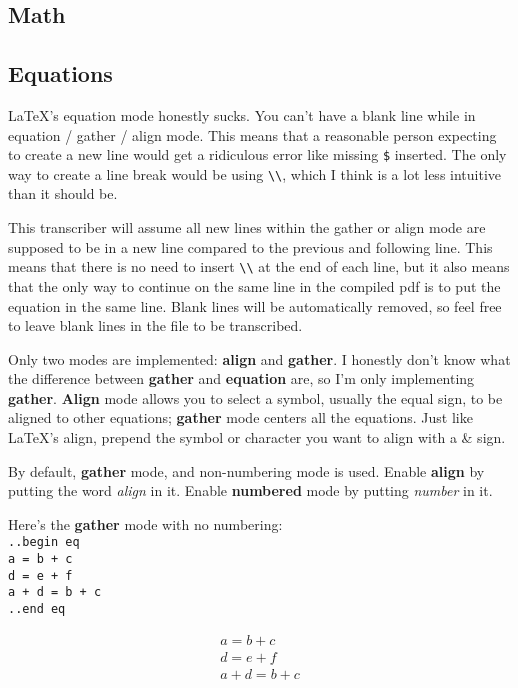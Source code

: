 \documentclass[12pt]{article}
\newcommand{\ital}{\emph}
\newcommand{\nl}{\\}
\renewcommand\bold{\textbf}
\begin{document}
\begin{flushleft}
\newpage

\section*{Math}

\subsection*{Equations}

LaTeX's equation mode honestly sucks. You can't have a blank line while in equation / gather / align mode. This means that a reasonable person expecting to create a new line would get a ridiculous error like missing \verb|$| inserted. The only way to create a line break would be using \verb|\\|, which I think is a lot less intuitive than it should be.

\medskip

This transcriber will assume all new lines within the gather or align mode are supposed to be in a new line compared to the previous and following line. This means that there is no need to insert \verb|\\| at the end of each line, but it also means that the only way to continue on the same line in the compiled pdf is to put the equation in the same line. Blank lines will be automatically removed, so feel free to leave blank lines in the file to be transcribed.

\medskip

Only two modes are implemented: \bold{align} and \bold{gather}. I honestly don't know what the difference between \bold{gather} and \bold{equation} are, so I'm only implementing \bold{gather}. \bold{Align} mode allows you to select a symbol, usually the equal sign, to be aligned to other equations; \bold{gather} mode centers all the equations. Just like LaTeX's align, prepend the symbol or character you want to align with a \& sign.

\medskip

By default, \bold{gather} mode, and non-numbering mode is used. Enable \bold{align} by putting the word \ital{align} in it. Enable \bold{numbered} mode by putting \ital{number} in it.

\medskip

Here's the \bold{gather} mode with no numbering: \nl
\verb|..begin eq|\nl
\verb|a = b + c|\nl
\verb|d = e + f|\nl
\verb|a + d = b + c|\nl
\verb|..end eq|

\begin{gather*}
a = b + c \\
d = e + f \\
a + d = b + c 
\end{gather*}


\end{flushleft}
\end{document}
